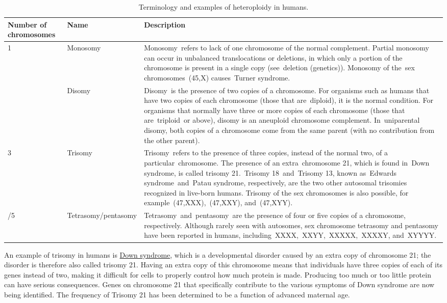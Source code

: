 \begin{longtable}[t]{>{\raggedright\arraybackslash}p{7em}>{\raggedright\arraybackslash}p{10em}>{\raggedright\arraybackslash}p{20em}}
\caption{\label{tab:heteroploidy}Terminology and examples of heteroploidy in humans.}\\
\toprule
Number of chromosomes & Name & Description\\
\midrule
\rowcolor{gray!6}  1 & Monosomy & Monosomy refers to lack of one chromosome of the normal complement. Partial monosomy can occur in unbalanced translocations or deletions, in which only a portion of the chromosome is present in a single copy (see deletion (genetics)). Monosomy of the sex chromosomes (45,X) causes Turner syndrome.\\
2 & Disomy & Disomy is the presence of two copies of a chromosome. For organisms such as humans that have two copies of each chromosome (those that are diploid), it is the normal condition. For organisms that normally have three or more copies of each chromosome (those that are triploid or above), disomy is an aneuploid chromosome complement. In uniparental disomy, both copies of a chromosome come from the same parent (with no contribution from the other parent).\\
\rowcolor{gray!6}  3 & Trisomy & Trisomy refers to the presence of three copies, instead of the normal two, of a particular chromosome. The presence of an extra chromosome 21, which is found in Down syndrome, is called trisomy 21. Trisomy 18 and Trisomy 13, known as Edwards syndrome and Patau syndrome, respectively, are the two other autosomal trisomies recognized in live-born humans. Trisomy of the sex chromosomes is also possible, for example (47,XXX), (47,XXY), and (47,XYY).\\
4/5 & Tetrasomy/pentasomy & Tetrasomy and pentasomy are the presence of four or five copies of a chromosome, respectively. Although rarely seen with autosomes, sex chromosome tetrasomy and pentasomy have been reported in humans, including XXXX, XXYY, XXXXX, XXXXY, and XYYYY.\\
\bottomrule
\end{longtable}

An example of trisomy in humans is \href{https://en.wikipedia.org/wiki/Down_syndrome}{Down syndrome}, which is a developmental disorder caused by an extra copy of chromosome 21; the disorder is therefore also called trisomy 21. Having an extra copy of this chromosome means that individuals have three copies of each of its genes instead of two, making it difficult for cells to properly control how much protein is made. Producing too much or too little protein can have serious consequences. Genes on chromosome 21 that specifically contribute to the various symptoms of Down syndrome are now being identified. The frequency of Trisomy 21 has been determined to be a function of advanced maternal age.



